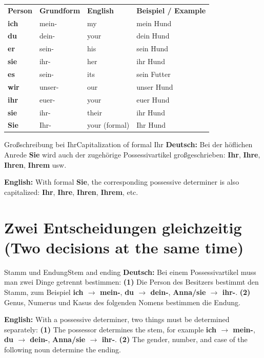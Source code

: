 \documentclass[a4paper,11pt]{article}
\newcommand{\GermanText}[1]{\textbf{Deutsch: }#1\par}
\newcommand{\EnglishText}[1]{{\small\color{SoftGray}\textbf{English: }#1\par}}
\begin{document}
\begin{longtable}{>{\bfseries}p{2.2cm}|p{3.0cm}|p{3.2cm}|p{5.0cm}}
\rowcolor{HeaderBlueDark}
\color{white}\textbf{Person} &
\color{white}\textbf{Grundform} &
\color{white}\textbf{English} &
\color{white}\textbf{Beispiel / Example} \\
ich & mein- & my & mein Hund \\
du & dein- & your & dein Hund \\
er & sein- & his & sein Hund \\
sie & ihr- & her & ihr Hund \\
es & sein- & its & sein Futter \\
wir & unser- & our & unser Hund \\
ihr & euer- & your & euer Hund \\
sie & ihr- & their & ihr Hund \\
Sie & Ihr- & your (formal) & Ihr Hund \\
\end{longtable}

\begin{grammarentry}{Großschreibung bei \glqq Ihr\grqq}{Capitalization of formal \glqq Ihr\grqq}
\GermanText{Bei der höflichen Anrede \textbf{Sie} wird auch der zugehörige Possessivartikel großgeschrieben: \textbf{Ihr}, \textbf{Ihre}, \textbf{Ihren}, \textbf{Ihrem} usw.}
\EnglishText{With formal \textbf{Sie}, the corresponding possessive determiner is also capitalized: \textbf{Ihr}, \textbf{Ihre}, \textbf{Ihren}, \textbf{Ihrem}, etc.}
\end{grammarentry}

\section{Zwei Entscheidungen gleichzeitig \textnormal{(Two decisions at the same time)}}

\begin{grammarentry}{Stamm und Endung}{Stem and ending}
\GermanText{Bei einem Possessivartikel muss man zwei Dinge getrennt bestimmen: \textbf{(1)} Die Person des Besitzers bestimmt den Stamm, zum Beispiel \textbf{ich $\rightarrow$ mein-}, \textbf{du $\rightarrow$ dein-}, \textbf{Anna/sie $\rightarrow$ ihr-}. \textbf{(2)} Genus, Numerus und Kasus des folgenden Nomens bestimmen die Endung.}
\EnglishText{With a possessive determiner, two things must be determined separately: \textbf{(1)} The possessor determines the stem, for example \textbf{ich $\rightarrow$ mein-}, \textbf{du $\rightarrow$ dein-}, \textbf{Anna/sie $\rightarrow$ ihr-}. \textbf{(2)} The gender, number, and case of the following noun determine the ending.}
\end{grammarentry}
\end{document}
